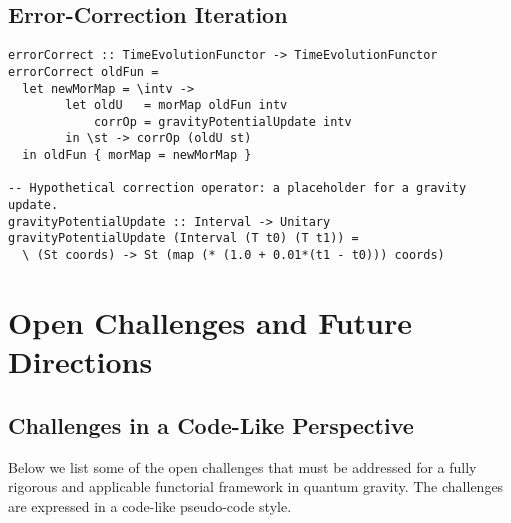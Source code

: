 \documentclass[12pt]{article}
\begin{document}
\subsection{Error-Correction Iteration}
\begin{lstlisting}[caption={Iterative correction incorporating gravitational potential}]
errorCorrect :: TimeEvolutionFunctor -> TimeEvolutionFunctor
errorCorrect oldFun =
  let newMorMap = \intv ->
        let oldU   = morMap oldFun intv
            corrOp = gravityPotentialUpdate intv
        in \st -> corrOp (oldU st)
  in oldFun { morMap = newMorMap }

-- Hypothetical correction operator: a placeholder for a gravity update.
gravityPotentialUpdate :: Interval -> Unitary
gravityPotentialUpdate (Interval (T t0) (T t1)) =
  \ (St coords) -> St (map (* (1.0 + 0.01*(t1 - t0))) coords)
\end{lstlisting}

\section{Open Challenges and Future Directions}
\subsection{Challenges in a Code-Like Perspective}
Below we list some of the open challenges that must be addressed for a fully rigorous and applicable functorial framework in quantum gravity. The challenges are expressed in a code-like pseudo-code style.
\end{document}
